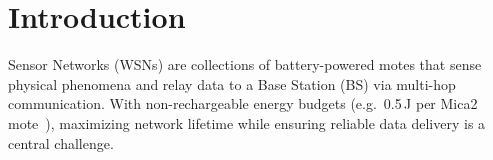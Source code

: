 \documentclass[12pt, onecolumn, journal]{IEEEtran}
\begin{document}
\maketitle
\linenumbers   %

\IEEEdisplaynontitleabstractindextext







%
\IEEEpeerreviewmaketitle



\section{Introduction}
\label{sec:introduction}

 Sensor Networks (WSNs) are collections of battery-powered motes that sense physical phenomena and relay data to a Base Station (BS) via multi-hop communication.
With non-rechargeable energy budgets (e.g.\ 0.5\,J per Mica2 mote~\cite{heinzelman2002leach}), maximizing network lifetime while ensuring reliable data delivery is a central challenge.
\end{document}

